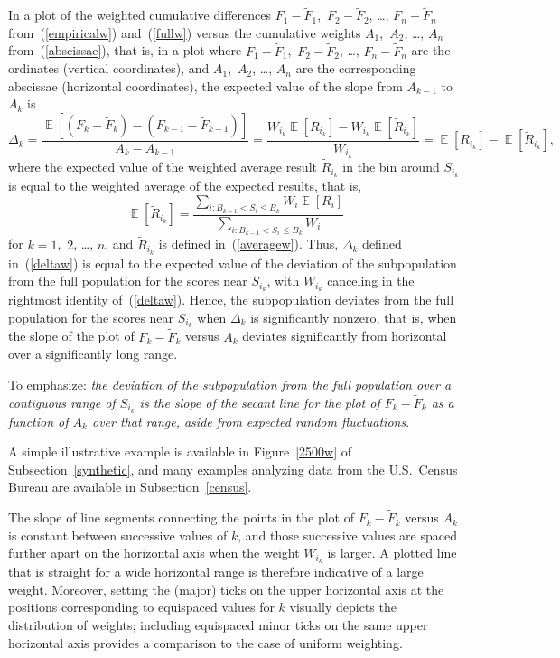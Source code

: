 \documentclass{article}
\DeclareMathOperator{\E}{\mathop{}\mathbb{E}}
\begin{document}
In a plot of the weighted cumulative differences
$F_1-\tilde{F}_1$,~$F_2-\tilde{F}_2$, \dots, $F_n-\tilde{F}_n$
from~(\ref{empiricalw}) and~(\ref{fullw})
versus the cumulative weights
$A_1$,~$A_2$, \dots, $A_n$ from~(\ref{abscissae}), that is, in a plot where 
$F_1-\tilde{F}_1$,~$F_2-\tilde{F}_2$, \dots, $F_n-\tilde{F}_n$
are the ordinates (vertical coordinates), and $A_1$,~$A_2$, \dots, $A_n$
are the corresponding abscissae (horizontal coordinates),
the expected value of the slope from $A_{k-1}$ to $A_k$ is
%
\begin{equation}
\label{deltaw}
\Delta_k
= \frac{\E[(F_k-\tilde{F}_k) - (F_{k-1}-\tilde{F}_{k-1})]}{A_k-A_{k-1}}
= \frac{W_{i_k}\!\E[R_{i_k}] - W_{i_k}\!\E[\tilde{R}_{i_k}]}{W_{i_k}}
= \E[R_{i_k}] - \E[\tilde{R}_{i_k}],
\end{equation}
%
where the expected value of the weighted average result $\tilde{R}_{i_k}$
in the bin around $S_{i_k}$ is equal to the weighted average
of the expected results, that is,
%
\begin{equation}
\label{linearityw}
\E[ \tilde{R}_{i_k} ]
= \frac{\sum_{i : B_{k-1} < S_i \le B_k} W_i \E[ R_i ]}
       {\sum_{i : B_{k-1} < S_i \le B_k} W_i}
\end{equation}
%
for $k = 1$,~$2$, \dots, $n$,
and $\tilde{R}_{i_k}$ is defined in~(\ref{averagew}).
Thus, $\Delta_k$ defined in~(\ref{deltaw})
is equal to the expected value of the deviation of the subpopulation
from the full population for the scores near $S_{i_k}$,
with $W_{i_k}$ canceling in the rightmost identity of~(\ref{deltaw}). Hence,
the subpopulation deviates from the full population for the scores near
$S_{i_k}$ when $\Delta_k$ is significantly nonzero, that is, when the slope
of the plot of $F_k-\tilde{F}_k$ versus $A_k$ deviates significantly
from horizontal over a significantly long range.

To emphasize: {\it the deviation of the subpopulation from the full population
over a contiguous range of $S_{i_k}$
is the slope of the secant line for the plot of $F_k-\tilde{F}_k$
as a function of $A_k$ over that range,
aside from expected random fluctuations}.

A simple illustrative example is available in Figure~\ref{2500w}
of Subsection~\ref{synthetic}, and many examples analyzing data
from the U.S.\ Census Bureau are available in Subsection~\ref{census}.

The slope of line segments connecting the points
in the plot of $F_k-\tilde{F}_k$ versus $A_k$
is constant between successive values of $k$,
and those successive values are spaced further apart on the horizontal axis
when the weight $W_{i_k}$ is larger.
A plotted line that is straight for a wide horizontal range is therefore
indicative of a large weight.
Moreover, setting the (major) ticks on the upper horizontal axis
at the positions corresponding to equispaced values for $k$ visually depicts
the distribution of weights; including equispaced minor ticks
on the same upper horizontal axis provides a comparison to the case
of uniform weighting.
\end{document}
